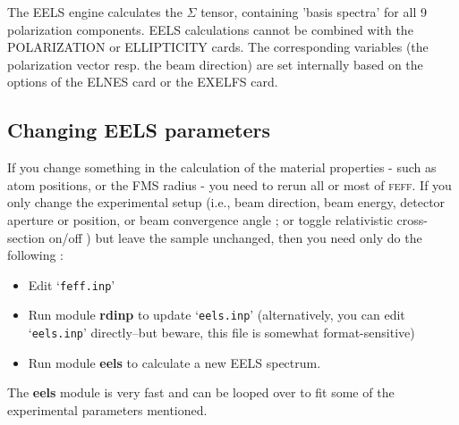 \documentclass[11pt,oneside]{report} %
\renewcommand{\htmlref}[2]{\hyperlink{#2}{#1}}
\newcommand{\program}[1]{\textsc{#1}}
\newcommand{\feff}{\program{feff}}
\newcommand{\file}[1]{`\texttt{#1}'}
\newcommand{\module}[1]{\textrm{\bf{#1}}}
\renewcommand{\htmlref}[2]{{#1}} %
\begin{document}
  The EELS engine calculates the $\Sigma$ tensor, containing 'basis spectra' for 
all 9 polarization components.  EELS calculations cannot be combined with the \htmlref{POLARIZATION}{card:pol} or \htmlref{ELLIPTICITY}{card:ell} cards.  The
corresponding variables (the polarization vector resp. the beam direction) are set internally based on the options of the \htmlref{ELNES}{card:eln} card or the \htmlref{EXELFS}{card:exe} card.



\subsection{Changing EELS parameters}
\label{sec:EELS-changing}
If you change something in the calculation of the material properties - such as atom 
positions, or the FMS radius - you need to rerun all or most of {\feff}.
If you only change the experimental setup  (i.e., beam direction, beam energy, detector aperture or position, or beam convergence angle ; or toggle relativistic cross-section on/off ) but leave the sample unchanged, then you need only do the following :

\begin{itemize} \tightlist
  \item Edit \file{feff.inp}
  \item Run module \module{rdinp} to update \file{eels.inp} (alternatively, you can edit 
    \file{eels.inp} directly--but beware, this file is somewhat format-sensitive)
  \item Run module \module{eels} to calculate a new EELS spectrum.
\end{itemize}


 The \module{eels} module is very fast and can be looped over to fit some of the experimental parameters mentioned.

\end{document}
